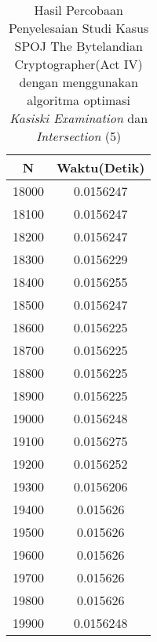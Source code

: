 \begin{table}[H]
\centering
\caption {Hasil Percobaan Penyelesaian Studi Kasus SPOJ The Bytelandian Cryptographer(Act IV) dengan menggunakan algoritma optimasi \textit{Kasiski Examination} dan \textit{Intersection} (5)}
\begin{tabular}{|c|c|}\hline
N&Waktu(Detik)\\ \hline
18000&0.0156247\\ \hline
18100&0.0156247\\ \hline
18200&0.0156247\\ \hline
18300&0.0156229\\ \hline
18400&0.0156255\\ \hline
18500&0.0156247\\ \hline
18600&0.0156225\\ \hline
18700&0.0156225\\ \hline
18800&0.0156225\\ \hline
18900&0.0156225\\ \hline
19000&0.0156248\\ \hline
19100&0.0156275\\ \hline
19200&0.0156252\\ \hline
19300&0.0156206\\ \hline
19400&0.015626\\ \hline
19500&0.015626\\ \hline
19600&0.015626\\ \hline
19700&0.015626\\ \hline
19800&0.015626\\ \hline
19900&0.0156248\\ \hline
\end{tabular}
\label{tab:1res11}
\end{table}



